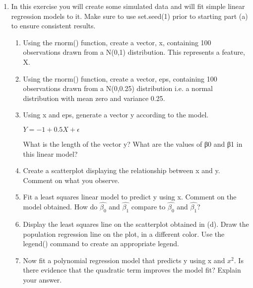 \begin{enumerate}
    \item In this exercise you will create some simulated data and will fit simple linear regression models to it. Make sure to use set.seed(1) prior to starting part (a) to ensure consistent results.
    \begin{enumerate}
    \item Using the rnorm() function, create a vector, x, containing 100 observations drawn from a N(0,1) distribution. This represents a feature, X. \\



    \item Using the rnorm() function, create a vector, eps, containing 100 observations drawn from a N(0,0.25) distribution i.e. a normal distribution with mean zero and variance 0.25.\\



    \item Using x and eps, generate a vector y according to the model.\\ \begin{center} $Y = -1 + 0.5X+ \epsilon$ \end{center} What is the length of the vector y? What are the values of β0 and β1 in this
    linear model? \\


    \item Create a scatterplot displaying the relationship between x and y. Comment on what you observe. \\


    \item Fit a least squares linear model to predict y using x. Comment on the model obtained. How do $\hat{\beta_0}$ and $\hat{\beta_1}$ compare to
    $\hat{\beta_0}$ and $\hat{\beta_1}$? \\


    \item Display the least squares line on the scatterplot obtained in (d). Draw the population regression line on
    the plot, in a different color. Use the legend() command to create an appropriate legend. \\


    \item Now fit a polynomial regression model that predicts y using x and $x^2$. Is
    there evidence that the quadratic term improves the model fit? Explain your
    answer. \\


\end{enumerate}
\end{enumerate}
